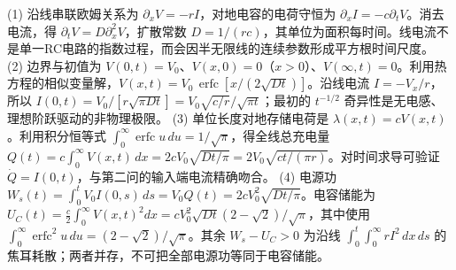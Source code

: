 (1) 沿线串联欧姆关系为 \(\partial_x V=-rI\)，对地电容的电荷守恒为 \(\partial_x I=-c\partial_tV\)。消去电流，得 \(\partial_tV=D\partial_x^2V\)，扩散常数 \(D=1/(rc)\)，其单位为面积每时间。线电流不是单一RC电路的指数过程，而会因半无限线的连续参数形成平方根时间尺度。
(2) 边界与初值为 \(V(0,t)=V_0\)、\(V(x,0)=0\)（\(x>0\)）、\(V(\infty,t)=0\)。利用热方程的相似变量解，\(V(x,t)=V_0\,\operatorname{erfc}[x/(2\sqrt{Dt})]\)。沿线电流 \(I=-V_x/r\)，所以 \(I(0,t)=V_0/[r\sqrt{\pi Dt}]=V_0\sqrt{c/r}/\sqrt{\pi t}\)；最初的 \(t^{-1/2}\) 奇异性是无电感、理想阶跃驱动的非物理极限。
(3) 单位长度对地存储电荷是 \(\lambda(x,t)=cV(x,t)\)。利用积分恒等式 \(\int_0^\infty\operatorname{erfc}u\,du=1/\sqrt\pi\)，得全线总充电量 \(Q(t)=c\int_0^\infty V(x,t)\,dx=2cV_0\sqrt{Dt/\pi}=2V_0\sqrt{ct/(\pi r)}\)。对时间求导可验证 \(\dot Q=I(0,t)\)，与第二问的输入端电流精确吻合。
(4) 电源功 \(W_s(t)=\int_0^tV_0I(0,s)\,ds=V_0Q(t)=2cV_0^2\sqrt{Dt/\pi}\)。电容储能为 \(U_C(t)=\frac c2\int_0^\infty V(x,t)^2dx=cV_0^2\sqrt{Dt}(2-\sqrt2)/\sqrt\pi\)，其中使用 \(\int_0^\infty\operatorname{erfc}^2u\,du=(2-\sqrt2)/\sqrt\pi\)。其余 \(W_s-U_C>0\) 为沿线 \(\int_0^t\int_0^\infty rI^2\,dx\,ds\) 的焦耳耗散；两者并存，不可把全部电源功等同于电容储能。
